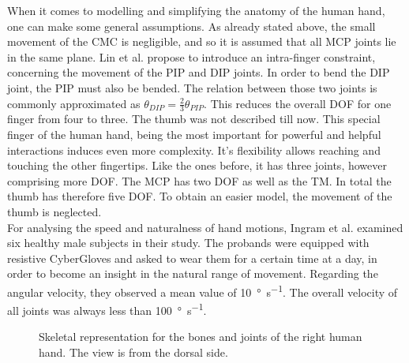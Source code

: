 When it comes to modelling and simplifying the anatomy of the human hand, one can make some general assumptions. As already stated above, the small movement of the \ac{CMC} is negligible, and so it is assumed that all \ac{MCP} joints lie in the same plane. Lin et al. propose to introduce an intra-finger constraint, concerning the movement of the \ac{PIP} and \ac{DIP} joints. In order to bend the \ac{DIP} joint, the \ac{PIP} must also be bended. The relation between those two joints is commonly approximated as $ \theta_{DIP} = \frac{2}{3} \theta_{PIP} $. This reduces the overall \ac{DOF} for one finger from four to three. The thumb was not described till now. This special finger of the human hand, being the most important for powerful and helpful interactions induces even more complexity. It's flexibility allows reaching and touching the other fingertips. Like the ones before, it has three joints, however comprising more \ac{DOF}. The \ac{MCP} has two \ac{DOF} as well as the \ac{TM}. In total the thumb has therefore five \ac{DOF}. To obtain an easier model, the movement of the thumb is neglected.\\
For analysing the speed and naturalness of hand motions, Ingram et al. \cite{ingram2008statistics} examined six healthy male subjects in their study. The probands were equipped with resistive CyberGloves and asked to wear them for a certain time at a day, in order to become an insight in the natural range of movement. Regarding the angular velocity, they observed a mean value of \SI[per-mode=symbol]{10}{\degree \per \second}. The overall velocity of all joints was always less than \SI[per-mode=symbol]{100}{\degree \per \second}.


\begin{figure}[h]
\centering
	\hfill
\caption[Bone and joint definitions of the human hand.]
{Skeletal representation for the bones and joints of the right human hand. The view is from the dorsal side.\cite{bullock2012assessing}}
\label{fig:skeletHand}
\end{figure}

